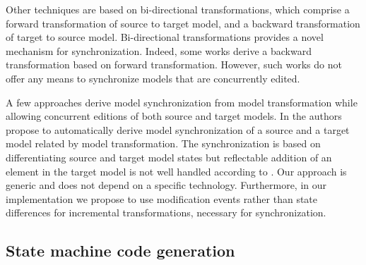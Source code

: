 Other techniques \cite{foster_combinators_2007}
are based on bi-directional transformations, which comprise a forward transformation of
source to target model, and a backward transformation of target to source model.
Bi-directional transformations provides a novel mechanism for synchronization.
Indeed, some works \cite{Matsuda2015} derive a backward transformation based on forward
transformation.
However, such works do not offer any means to synchronize models that are concurrently edited.

A few approaches derive model synchronization from model transformation while allowing concurrent editions
of both source and target models.
In \cite{xiong_towards_2007} the authors propose to automatically derive
model synchronization of a source and a target model related by
model transformation.
The synchronization is based on differentiating source and target model states
but reflectable addition of an element in the target model is not well handled according to \cite{xiong_towards_2007}.
Our approach is generic and does not depend on a specific technology. Furthermore, in our implementation
we propose to use modification events rather than state differences for incremental
transformations, necessary for synchronization.

\subsection{State machine code generation}

\label{sec:relatedwork}


